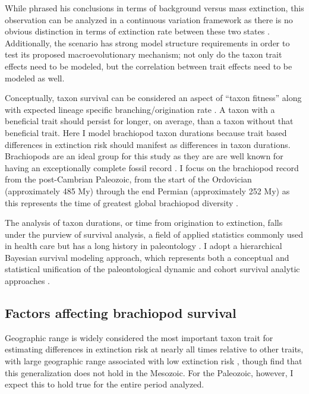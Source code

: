 \documentclass{article}
\begin{document}
While \citet{Jablonski1986} phrased his conclusions in terms of background versus mass extinction, this observation can be analyzed in a continuous variation framework as there is no obvious distinction in terms of extinction rate between these two states \citep{Wang2003,Payne2007,Simpson2009}. Additionally, the \citet{Jablonski1986} scenario has strong model structure requirements in order to test its proposed macroevolutionary mechanism; not only do the taxon trait effects need to be modeled, but the correlation between trait effects need to be modeled as well. 

Conceptually, taxon survival can be considered an aspect of ``taxon fitness'' along with expected lineage specific branching/origination rate \citep{Cooper1984,Palmer2012}. A taxon with a beneficial trait should persist for longer, on average, than a taxon without that beneficial trait. Here I model brachiopod taxon durations because trait based differences in extinction risk should manifest as differences in taxon durations. Brachiopods are an ideal group for this study as they are are well known for having an exceptionally complete fossil record \citep{Foote1996e,Foote2000a}. I focus on the brachiopod record from the post-Cambrian Paleozoic, from the start of the Ordovician (approximately 485 My) through the end Permian (approximately 252 My) as this represents the time of greatest global brachiopod diversity \citep{Alroy2010}.

The analysis of taxon durations, or time from origination to extinction, falls under the purview of survival analysis, a field of applied statistics commonly used in health care \citep{Klein2003} but has a long history in paleontology \citep{Simpson1944,Simpson1953,VanValen1973,VanValen1979,Smits2015,Crampton2016}. I adopt a hierarchical Bayesian survival modeling approach, which represents both a conceptual and statistical unification of the paleontological dynamic and cohort survival analytic approaches \citep{VanValen1973,VanValen1979,Raup1978,Raup1975,Foote1988,Baumiller1993,Simpson2006,Smits2015,Crampton2016,Ezard2012b}.

\subsection{Factors affecting brachiopod survival}

Geographic range is widely considered the most important taxon trait for estimating differences in extinction risk at nearly all times relative to other traits, with large geographic range associated with low extinction risk \citep{Jablonski1986,Jablonski1987,Jablonski2003,Payne2007,Jablonski2008a,Harnik2013,Finnegan2012a}, though \citet{Foote2013} find that this generalization does not hold in the Mesozoic. For the Paleozoic, however, I expect this to hold true for the entire period analyzed.
\end{document}

